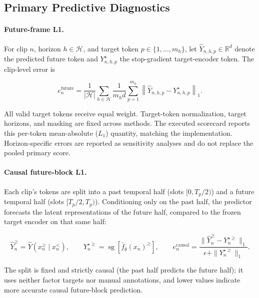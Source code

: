 \subsection{Primary Predictive Diagnostics}
\label{app:primary_metric_definitions}

\paragraph{Future-frame L1.}
For clip \(n\), horizon \(h\in\mathcal H\), and target token
\(p\in\{1,\ldots,m_h\}\), let
\(\widehat Y_{n,h,p}\in\mathbb R^d\) denote the predicted future token
and \(Y^\star_{n,h,p}\) the stop-gradient target-encoder token. The
clip-level error is

\begin{equation*}
e_n^{\mathrm{future}}
=
\frac{1}{|\mathcal H|}
\sum_{h\in\mathcal H}
\frac{1}{m_h d}
\sum_{p=1}^{m_h}
\left\|
\widehat Y_{n,h,p}
-
Y^\star_{n,h,p}
\right\|_1 .
\end{equation*}

All valid target tokens receive equal weight. Target-token
normalization, target horizons, and masking are fixed across methods.
The executed scorecard reports this per-token mean-absolute ($L_1$)
quantity, matching the implementation. Horizon-specific errors are
reported as sensitivity analyses and do not replace the pooled primary
score.

\paragraph{Causal future-block L1.}
Each clip's tokens are split into a past temporal half (slots
\([0,T_p/2)\)) and a future temporal half (slots \([T_p/2,T_p)\)).
Conditioning only on the past half, the predictor forecasts the latent
representations of the future half, compared to the frozen target
encoder on that same half:

\begin{equation*}
\widehat Y_n^{\ge}=\widehat Y\!\left(x_n^{\ge}\mid x_n^{<}\right),
\qquad
Y_n^{\star\ge}=\operatorname{sg}\!\left[\bar f_{\bar\theta}(x_n)^{\ge}\right],
\qquad
e_n^{\mathrm{causal}}=\frac{\|\widehat Y_n^{\ge}-Y_n^{\star\ge}\|_1}{\epsilon+\|Y_n^{\star\ge}\|_1}.
\end{equation*}

The split is fixed and strictly causal (the past half predicts the future
half); it uses neither factor targets nor manual annotations, and lower
values indicate more accurate causal future-block prediction.

